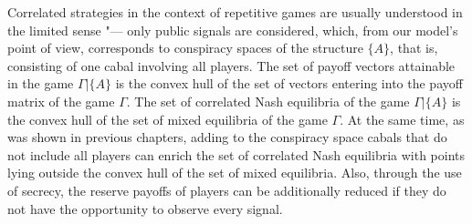 Correlated strategies in the context of repetitive games are usually understood in the limited sense "--- only public signals are considered, which, from our model's point of view, corresponds to conspiracy spaces of the structure $\{A\}$, that is, consisting of one cabal involving all players. The set of payoff vectors attainable in the game $\Gamma | \{A\}$ is the convex hull of the set of vectors entering into the payoff matrix of the game $\Gamma$. The set of correlated Nash equilibria of the game $\Gamma | \{A\}$ is the convex hull of the set of mixed equilibria of the game $\Gamma$. At the same time, as was shown in previous chapters, adding to the conspiracy space cabals that do not include all players can enrich the set of correlated Nash equilibria with points lying outside the convex hull of the set of mixed equilibria. Also, through the use of secrecy, the reserve payoffs of players can be additionally reduced if they do not have the opportunity to observe every signal. %

